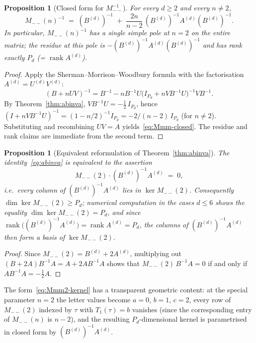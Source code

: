 \documentclass{amsart}
\newtheorem{proposition}[theorem]{Proposition}
\theoremstyle{definition}
\theoremstyle{remark}
\DeclareMathOperator{\rank}{rank}
\begin{document}
\begin{proposition}[Closed form for $M_{--}^{-1}$]
\label{prop:Mmm-closed}
For every $d \ge 2$ and every $n \ne 2$,
\begin{equation}\label{eq:Mmm-closed}
  M_{--}(n)^{-1}
  \;=\; (B^{(d)})^{-1}
  \;+\; \frac{2 n}{n - 2}\,
       (B^{(d)})^{-1} A^{(d)} (B^{(d)})^{-1}.
\end{equation}
In particular, $M_{--}(n)^{-1}$ has a single simple pole at
$n = 2$ on the entire matrix; the residue at this pole is
$-(B^{(d)})^{-1} A^{(d)} (B^{(d)})^{-1}$ and has rank exactly
$P_d$ (= $\rank A^{(d)}$).
\end{proposition}

\begin{proof}
Apply the Sherman--Morrison--Woodbury formula with the
factorisation $A^{(d)} = U^{(d)} V^{(d)}$:
\[
  (B + n U V)^{-1}
  = B^{-1} - n B^{-1} U \bigl(I_{P_d} + n V B^{-1} U\bigr)^{-1}
       V B^{-1}.
\]
By Theorem~\ref{thm:abinva},
$V B^{-1} U = -\tfrac12\, I_{P_d}$, hence
$(I + n V B^{-1} U)^{-1} = (1 - n/2)^{-1} I_{P_d}
= -2/(n-2)\,I_{P_d}$ (for $n \neq 2$).  Substituting and
recombining $U V = A$ yields~\eqref{eq:Mmm-closed}.  The
residue and rank claims are immediate from the second term.
\end{proof}

\begin{proposition}[Equivalent reformulation of
Theorem~\ref{thm:abinva}]
\label{prop:abinva-kernel}
The identity~\eqref{eq:abinva} is equivalent to the assertion
\begin{equation}\label{eq:Mmm2-kernel}
  M_{--}(2) \cdot (B^{(d)})^{-1} A^{(d)} \;=\; 0,
\end{equation}
i.e.\ every column of $(B^{(d)})^{-1} A^{(d)}$ lies in
$\ker M_{--}(2)$.  Consequently $\dim \ker M_{--}(2) \ge P_d$;
numerical computation in the cases $d \le 6$ shows the equality
$\dim \ker M_{--}(2) = P_d$, and since
$\rank \bigl((B^{(d)})^{-1} A^{(d)}\bigr) = \rank A^{(d)} = P_d$,
the columns of $(B^{(d)})^{-1} A^{(d)}$ then form a basis of
$\ker M_{--}(2)$.
\end{proposition}

\begin{proof}
Since $M_{--}(2) = B^{(d)} + 2 A^{(d)}$, multiplying out
$(B + 2A) B^{-1} A = A + 2 A B^{-1} A$ shows that
$M_{--}(2)\, B^{-1} A = 0$ if and only if
$A B^{-1} A = -\tfrac12 A$.
\end{proof}

The form~\eqref{eq:Mmm2-kernel} has a transparent geometric
content: at the special parameter $n = 2$ the letter values
become $a = 0$, $b = 1$, $c = 2$, every row of $M_{--}(2)$
indexed by $\tau$ with $T_1(\tau) = b$ vanishes (since the
corresponding entry of $M_{--}(n)$ is $n - 2$), and the resulting
$P_d$-dimensional kernel is parametrised in closed form by
$(B^{(d)})^{-1} A^{(d)}$.
\end{document}
